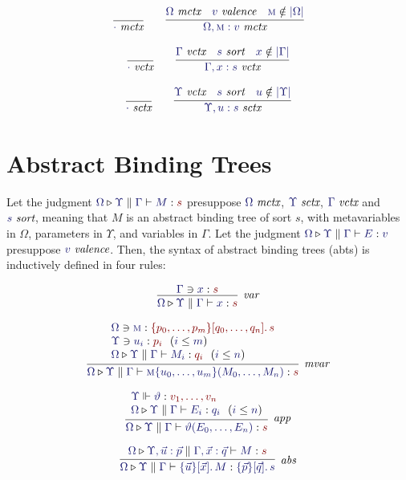 \documentclass[11pt]{article}
\theoremstyle{definition}
\theoremstyle{remark}
\numberwithin{equation}{section}
\def\IModeColorName{MidnightBlue}
\def\OModeColorName{Maroon}
\newcommand\IMode[1]{{\color{\IModeColorName}{#1}}}
\newcommand\OMode[1]{{\color{\OModeColorName}{#1}}}
\newcommand\HypJ[2]{#1\ \ (#2)}
\newcommand\MkValence[3]{%
  \ifthenelse{\equal{#1}{}}{}{%
    \{#1\}%
  }%
  \ifthenelse{\equal{#2}{}}{}{%
    [#2]%
  }.\, #3
}
\newcommand\MkBTm[3]{\{#1\}[#2].\, #3}
\newcommand\IsValence[1]{\IMode{#1}\ \textit{valence}}
\newcommand\IsSort[1]{\IMode{#1}\ \textit{sort}}
\newcommand\Leq[2]{\IMode{#1}\leq\IMode{#2}}
\newcommand\IsOperator[3]{\IMode{#1}\Vdash \IMode{#2} : \OMode{#3}}
\newcommand\IsMetaCtx[1]{\IMode{#1}\ \textit{mctx}}
\newcommand\IsVarCtx[1]{\IMode{#1}\ \textit{vctx}}
\newcommand\IsSymCtx[1]{\IMode{#1}\ \textit{sctx}}
\newcommand\Lookup[3]{\IMode{#1}\ni\IMode{#2}:\OMode{#3}}
\newcommand\IsAbt[5]{%
  \IMode{#1}\triangleright%
  \IMode{#2}\parallel%
  \IMode{#3}\vdash%
  \IMode{#4}:\OMode{#5}%
}
\newcommand\IsBTm[5]{%
  \IMode{#1}\triangleright%
  \IMode{#2}\parallel%
  \IMode{#3}\vdash%
  \IMode{#4}:\IMode{#5}%
}
\newcommand\MV[1]{\textsc{#1}}
\newcommand\MApp[3]{#1\{#2\}(#3)}
\newcommand\App[2]{#1(#2)}
\newcommand\Dom[1]{\left\vert #1\right\vert}
\newcommand\NotIn[2]{\IMode{#1}\notin\IMode{#2}}
\begin{document}
\begin{gather*}
  \infer{
    \IsMetaCtx{\cdot}
  }{
  }\qquad
  \infer{
    \IsMetaCtx{\Omega,\MV{m}:v}
  }{
    \IsMetaCtx{\Omega} &
    \IsValence{v} &
    \NotIn{\MV{m}}{\Dom\Omega}
  }
\end{gather*}

\begin{gather*}
  \infer{
    \IsVarCtx{\cdot}
  }{
  }\qquad
  \infer{
    \IsVarCtx{\Gamma,x:s}
  }{
    \IsVarCtx{\Gamma} &
    \IsSort{s} &
    \NotIn{x}{\Dom\Gamma}
  }
\end{gather*}

\begin{gather*}
  \infer{
    \IsSymCtx{\cdot}
  }{
  }\qquad
  \infer{
    \IsSymCtx{\Upsilon,u:s}
  }{
    \IsVarCtx{\Upsilon} &
    \IsSort{s} &
    \NotIn{u}{\Dom\Upsilon}
  }
\end{gather*}

\section{Abstract Binding Trees}

Let the judgment $\IsAbt{\Omega}{\Upsilon}{\Gamma}{M}{s}$ presuppose
$\IsMetaCtx{\Omega}$, $\IsSymCtx\Upsilon$, $\IsVarCtx\Gamma$ and $\IsSort{s}$,
meaning that $M$ is an abstract binding tree of sort $s$, with metavariables in
$\Omega$, parameters in $\Upsilon$, and variables in $\Gamma$. Let the judgment
$\IsBTm{\Omega}{\Upsilon}{\Gamma}{E}{v}$ presuppose $\IsValence{v}$.  Then, the
syntax of abstract binding trees (abts) is inductively defined in four rules:

\begin{gather*}
  \infer[\textit{var}]{
    \IsAbt{\Omega}{\Upsilon}{\Gamma}{x}{s}
  }{
    \Lookup{\Gamma}{x}{s}
  }\\[6pt]
  \infer[\textit{mvar}]{
    \IsAbt{\Omega}{\Upsilon}{\Gamma}{
      \MApp{\MV{m}}{u_0,\dots,u_m}{M_0,\dots,M_n}
    }{s}
  }{
    \begin{array}{l}
      \Lookup{\Omega}{\MV{m}}{\MkValence{p_0,\dots,p_m}{q_0,\dots,q_n}{s}}\\
      \HypJ{\Lookup{\Upsilon}{u_i}{p_i}}{\Leq{i}{m}}\\
      \HypJ{
        \IsAbt{\Omega}{\Upsilon}{\Gamma}{M_i}{q_i}
      }{
        \Leq{i}{n}
      }
    \end{array}
  }\\[6pt]
  \infer[\textit{app}]{
    \IsAbt{\Omega}{\Upsilon}{\Gamma}{
      \App{\vartheta}{E_0,\dots,E_n}
    }{s}
  }{
    \begin{array}{l}
      \IsOperator{\Upsilon}{\vartheta}{
        v_1,\dots,v_n
      }\\
      \HypJ{
        \IsBTm{\Omega}{\Upsilon}{\Gamma}{E_i}{q_i}
      }{
        \Leq{i}{n}
      }
    \end{array}
  }\\[6pt]
  \infer[\textit{abs}]{
    \IsBTm{\Omega}{\Upsilon}{\Gamma}{
      \MkBTm{\vec{u}}{\vec{x}}{M}
    }{
      \MkValence{\vec{p}}{\vec{q}}{s}
    }
  }{
    \IsAbt{\Omega}{\Upsilon, \vec{u}:\vec{p}}{\Gamma,\vec{x}:{\vec{q}}}{
      M
    }{
      s
    }
  }
\end{gather*}
\end{document}
